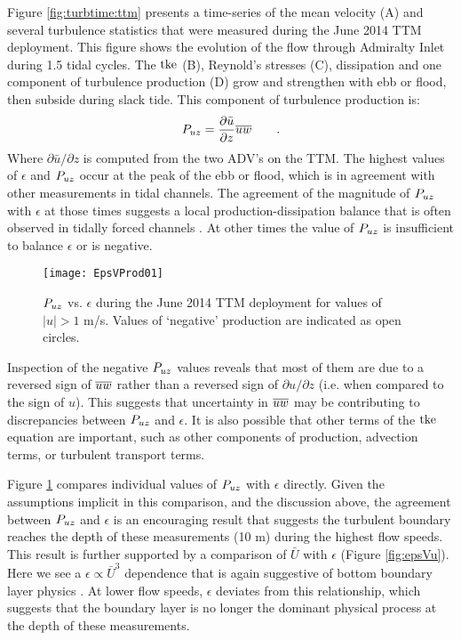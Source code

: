 Figure \ref{fig:turbtime:ttm} presents a time-series of the mean velocity (A) and several turbulence statistics that were measured during the June 2014 TTM deployment. This figure shows the evolution of the flow through Admiralty Inlet during 1.5 tidal cycles. The $\mathrm{tke}$ (B), Reynold's stresses (C), dissipation and one component of turbulence production (D) grow and strengthen with ebb or flood, then subside during slack tide.  This component of turbulence production is:
\begin{align}
  P_{uz} = \frac{\partial \bar{u}}{\partial z}\overline{uw} \qquad .
\end{align}
Where $\partial \bar{u}/\partial z$ is computed from the two ADV's on the TTM. The highest values of $\epsilon$ and $P_{uz}$ occur at the peak of the ebb or flood, which is in agreement with other measurements in tidal channels. The agreement of the magnitude of $P_{uz}$ with $\epsilon$ at those times suggests a local production-dissipation balance that is often observed in tidally forced channels \citep[]{Trowbridge++1999,Stacey++1999,McMillan++2016}. At other times the value of $P_{uz}$ is insufficient to balance $\epsilon$ or is negative.

\begin{figure}[t]
  \centering
  \texttt{[image: EpsVProd01]}
  \caption{$P_{uz}$ vs. $\epsilon$ during the June 2014 TTM deployment for values of $|u|>1$ m/s. Values of `negative' production are indicated as open circles. }
  \label{fig:prodVeps}
\end{figure}

Inspection of the negative $P_{uz}$ values reveals that most of them are due to a reversed sign of $\overline{uw}$ rather than a reversed sign of $\partial u / \partial z$ (i.e. when compared to the sign of $u$). This suggests that uncertainty in $\overline{uw}$ may be contributing to discrepancies between $P_{uz}$ and $\epsilon$. It is also possible that other terms of the $\mathrm{tke}$ equation are important, such as other components of production, advection terms, or turbulent transport terms.

Figure \ref{fig:prodVeps} compares individual values of $P_{uz}$ with $\epsilon$ directly. Given the assumptions implicit in this comparison, and the discussion above, the agreement between $P_{uz}$ and $\epsilon$ is an encouraging result that suggests the turbulent boundary reaches the depth of these measurements (10 m) during the highest flow speeds. This result is further supported by a comparison of $\bar{U}$ with $\epsilon$ (Figure \ref{fig:epsVu}). Here we see a $\epsilon \propto \bar{U}^3$ dependence that is again suggestive of bottom boundary layer physics \citep[]{Trowbridge1992,Nash++2009}. At lower flow speeds, $\epsilon$ deviates from this relationship, which suggests that the boundary layer is no longer the dominant physical process at the depth of these measurements.


